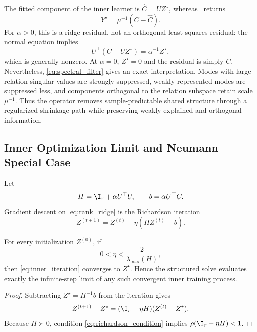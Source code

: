 The fitted component of the inner learner is $\widehat C=UZ^\star$, whereas
\LSSO\ returns
\begin{equation}
  Y^\star=\mu^{-1}(C-\widehat C).
  \label{eq:ridge_residual}
\end{equation}
For $\alpha>0$, this is a ridge residual, not an orthogonal least-squares
residual: the normal equation implies
\begin{equation}
  U^\top(C-UZ^\star)=\alpha^{-1}Z^\star,
\end{equation}
which is generally nonzero. At $\alpha=0$, $Z^\star=0$ and the residual is
simply $C$. Nevertheless, \cref{eq:spectral_filter} gives an
exact interpretation. Modes with large relation singular values are strongly
suppressed, weakly represented modes are suppressed less, and components
orthogonal to the relation subspace retain scale $\mu^{-1}$. Thus the operator
removes sample-predictable shared structure through a regularized shrinkage
path while preserving weakly explained and orthogonal information.

\subsection{Inner Optimization Limit and Neumann Special Case}

Let
\begin{equation}
  H=\I_r+\alpha U^\top U,
  \qquad b=\alpha U^\top C.
\end{equation}
Gradient descent on \cref{eq:rank_ridge} is the Richardson iteration
\begin{equation}
  Z^{(t+1)}=Z^{(t)}-\eta(HZ^{(t)}-b).
  \label{eq:inner_iteration}
\end{equation}

\begin{proposition}
\label{prop:inner_limit}
For every initialization $Z^{(0)}$, if
\begin{equation}
  0<\eta<\frac{2}{\lambda_{\max}(H)},
  \label{eq:richardson_condition}
\end{equation}
then \cref{eq:inner_iteration} converges to $Z^\star$. Hence the structured
solve evaluates exactly the infinite-step limit of any such convergent inner
training process.
\end{proposition}
\begin{proof}
Subtracting $Z^\star=H^{-1}b$ from the iteration gives
\[
  Z^{(t+1)}-Z^\star
  =(\I_r-\eta H)(Z^{(t)}-Z^\star).
\]
Because $H\succ0$, condition \cref{eq:richardson_condition} implies
$\rho(\I_r-\eta H)<1$.
\end{proof}

